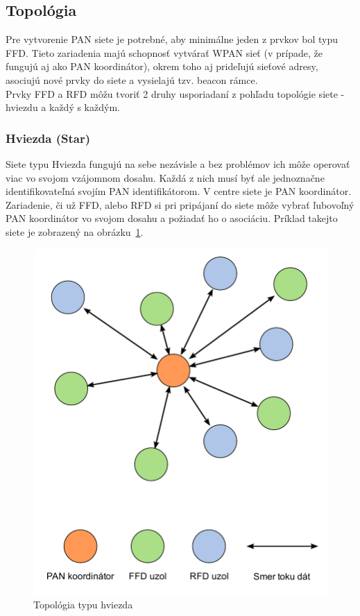 \subsection{Topológia}
\indent\indent Pre vytvorenie PAN siete je potrebné, aby minimálne jeden z prvkov bol typu FFD. Tieto zariadenia majú schopnosť vytvárať WPAN sieť (v prípade, že fungujú aj ako PAN koordinátor), okrem toho aj prideľujú sieťové adresy, asociujú nové prvky do siete a vysielajú tzv. beacon rámce.\\
\indent Prvky FFD a RFD môžu tvoriť 2 druhy usporiadaní z pohľadu topológie siete - hviezdu a každý s každým.\\
\subsubsection{Hviezda (Star)}
\indent\indent Siete typu Hviezda fungujú na sebe nezávisle a bez problémov ich môže operovať viac vo svojom vzájomnom dosahu. Každá z nich musí byť ale jednoznačne identifikovateľná svojím PAN identifikátorom. V centre siete je PAN koordinátor. Zariadenie, či už FFD, alebo RFD si pri pripájaní do siete môže vybrať ľubovoľný PAN koordinátor vo svojom dosahu a požiadať ho o asociáciu. Príklad takejto siete je zobrazený na obrázku~\ref{fig:topology_star}.\\
\begin{figure}[htbp]
\begin{center}
\includegraphics[width=120mm]{figures/topology_star}
\caption{Topológia typu hviezda}
\label{fig:topology_star}
\end{center}
\end{figure} 
